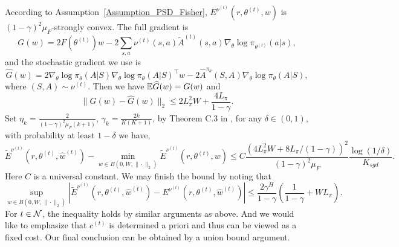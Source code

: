 According to Assumption~\ref{Assumption_PSD_Fisher}, $E^{\nu^{(t)}}(r,\theta^{(t)},w)$ is $(1-\gamma)^2\mu_F$-strongly convex.
The full gradient is
$$G(w)=2F(\theta^{(t)})w-2\sum_{s,a}\nu^{(t)}(s,a)\widetilde{A}^{(t)}(s,a)\nabla_\theta\log\pi_{\theta^{(t)}}(a|s),
$$
and the stochastic gradient we use is 
$$\widehat G(w)=2\nabla_\theta\log\pi_\theta(A|S)\nabla_\theta\log\pi_\theta(A|S)^\top w-2\widehat A^{\pi_\theta}(S,A)\nabla_\theta\log\pi_\theta(A|S),
$$
where $(S,A)\sim \nu^{(t)}$.
Then we have ${\mathbb E}\widehat G(w)=G(w)$ and
$$
\|G(w)-\widehat G(w)\|_2\leq 2L_\pi^2W+\frac{4L_\pi}{1-\gamma}.
$$
Set $\eta_k=\frac{2}{(1-\gamma)^2\mu_F(k+1)}$, $\gamma_k=\frac{2k}{K(K+1)}$, by Theorem C.3 in \cite{Harvey2019Simple}, for any $\delta\in(0,1)$, with probability at least $1-\delta$ we have,
$$
\widetilde{E}^{\nu^{(t)}}\left(r, \theta^{(t)}, \hat w^{(t)}\right)-\min_{w\in B(0,W,\|\cdot\|_2)} \widetilde{E}^{\nu^{(t)}}(r,\theta^{(t)},w)\leq C\frac{(4L_\pi^2W+8L_\pi/(1-\gamma))^2}{(1-\gamma)^2\mu_F}\frac{\log(1/\delta)}{K_{sgd}}.
$$
Here $C$ is a universal constant.
We may finish the bound by noting that
$$
\sup_{w\in B(0,W,\|\cdot\|_2)}\left|\widetilde{E}^{\nu^{(t)}}\left(r, \theta^{(t)}, \hat w^{(t)}\right)-E^{\nu^{(t)}}\left(r, \theta^{(t)}, \hat w^{(t)}\right)\right|\leq \frac{2\gamma^H}{1-\gamma}\left(\frac{1}{1-\gamma}+WL_\pi\right).
$$
For $t\in{\mathcal{N}}$, the inequality holds by similar arguments as above.
And we would like to emphasize that $c^{(t)}$ is determined a priori and thus can be viewed as a fixed cost.
Our final conclusion can be obtained by a union bound argument.
\endproof

